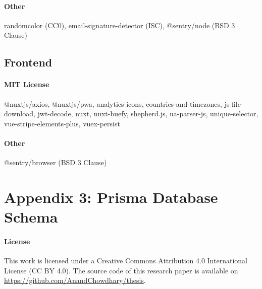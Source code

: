 \documentclass{article}
\begin{document}
\paragraph{Other} randomcolor (CC0), email-signature-detector (ISC), @sentry/node (BSD 3 Clause)

\subsection*{Frontend}

\paragraph{MIT License} @nuxtjs/axios, @nuxtjs/pwa, analytics-icons, countries-and-timezones, js-file-download, jwt-decode, nuxt, nuxt-buefy, shepherd.js, ua-parser-js, unique-selector, vue-stripe-elements-plus, vuex-persist

\paragraph{Other} @sentry/browser (BSD 3 Clause)

\newpage

\section*{Appendix 3: Prisma Database Schema}

\newpage




\paragraph{License} This work is licensed under a Creative Commons Attribution 4.0 International License (CC BY 4.0). The source code of this research paper is available on \url{https://github.com/AnandChowdhary/thesis}.
\end{document}
